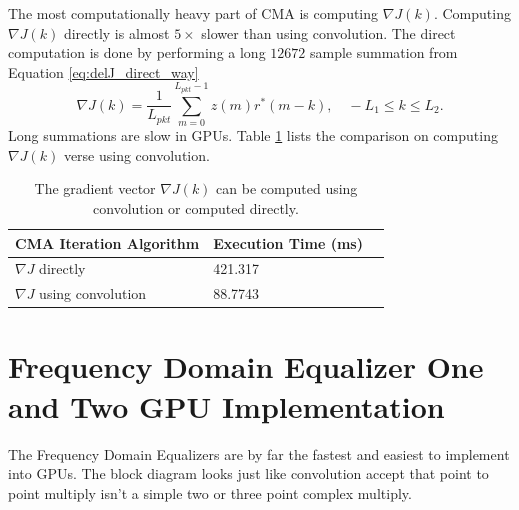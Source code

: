 The most computationally heavy part of CMA is computing $\nabla J(k)$.
Computing $\nabla J(k)$ directly is almost $5\times$ slower than using convolution.
The direct computation is done by performing a long $12672$ sample summation from Equation \ref{eq:delJ_direct_way}
\begin{equation}
\nabla J(k) = \frac{1}{L_{pkt}} \sum^{L_{pkt}-1}_{m=0}  z(m) r^\ast(m-k), \quad -L_1 \leq k \leq L_2.
\end{equation}
Long summations are slow in GPUs.
Table \ref{tab:CMAtimingComparison} lists the comparison on computing $\nabla J(k)$ verse using convolution.
\begin{table}
\caption{The gradient vector $\nabla J(k)$ can be computed using convolution or computed directly.}
\begin{center}
\begin{tabular}{lll}
	\toprule
	CMA	Iteration Algorithm			& Execution Time (ms)	\\ \midrule
	$\nabla J$ directly 			& 421.317				\\
	$\nabla J$ using convolution & 88.7743				\\
	\bottomrule
\end{tabular}
\end{center}
\label{tab:CMAtimingComparison}
\end{table}



\section{Frequency Domain Equalizer One and Two GPU Implementation}
The Frequency Domain Equalizers are by far the fastest and easiest to implement into GPUs.
The block diagram looks just like convolution accept that point to point multiply isn't a simple two or three point complex multiply.

